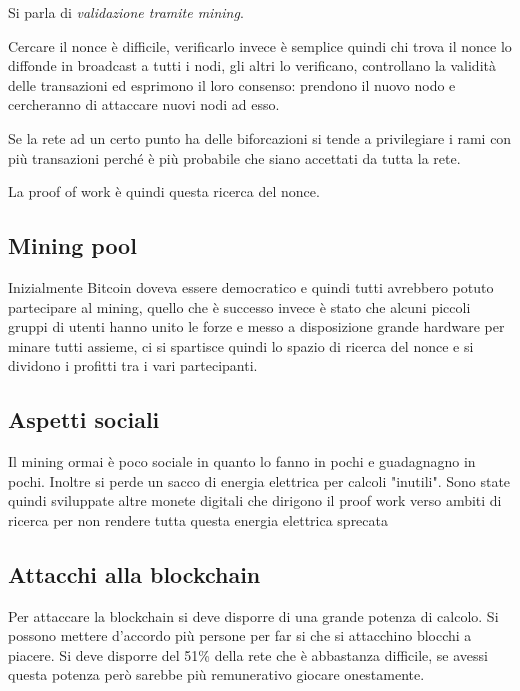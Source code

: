 Si parla di \emph{validazione tramite mining}.

Cercare il nonce è difficile, verificarlo invece è semplice quindi chi trova il nonce lo diffonde in broadcast a tutti i nodi, gli altri lo verificano, controllano la validità delle transazioni ed esprimono il loro consenso: prendono il nuovo nodo e cercheranno di attaccare nuovi nodi ad esso.

Se la rete ad un certo punto ha delle biforcazioni si tende a privilegiare i rami con più transazioni perché è più probabile che siano accettati da tutta la rete.

La proof of work è quindi questa ricerca del nonce.

\subsection{Mining pool}
Inizialmente Bitcoin doveva essere democratico e quindi tutti avrebbero potuto partecipare al mining, quello che è successo invece è stato che alcuni piccoli gruppi di utenti hanno unito le forze e messo a disposizione grande hardware per minare tutti assieme, ci si spartisce quindi lo spazio di ricerca del nonce e si dividono i profitti tra i vari partecipanti.

\subsection{Aspetti sociali}
Il mining ormai è poco sociale in quanto lo fanno in pochi e guadagnagno in pochi.
Inoltre si perde un sacco di energia elettrica per calcoli "inutili".
Sono state quindi sviluppate altre monete digitali che dirigono il proof work verso ambiti di ricerca per non rendere tutta questa energia elettrica sprecata

\subsection{Attacchi alla blockchain}
Per attaccare la blockchain si deve disporre di una grande potenza di calcolo.
Si possono mettere d'accordo più persone per far si che si attacchino blocchi a piacere.
Si deve disporre del 51\% della rete che è abbastanza difficile, se avessi questa potenza però sarebbe più remunerativo giocare onestamente.












